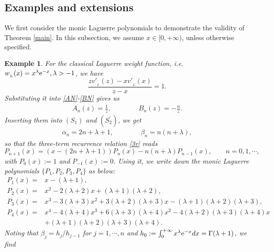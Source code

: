 \documentclass[12pt,a4paper]{article}    %
\newcommand{\e}{{\rm e}}
\newtheorem{exm}{Example}
\numberwithin{equation}{section}
\begin{document}
\subsection{Examples and extensions}\label{exL}
We first consider the monic Laguerre polynomials to demonstrate the validity of Theorem \ref{main}.
In this subsection, we assume $x\in[0,+\infty)$, unless otherwise specified.
		
\begin{exm}
For the classical Laguerre weight function, i.e. $w_{_L}(x)=x^{\lambda}\e^{-x}, \lambda>-1$, we have
\begin{equation*}
\frac{zv'_{_L}(z)-xv'_{_L}(x)}{z-x}=1.
\end{equation*}
Substituting it into \eqref{AN}-\eqref{BN} gives us
\begin{align*}
A_n(z)=\frac{1}{z},\qquad\qquad	
B_n(z)=-\frac{n}{z}.
\end{align*}
Inserting them into $(S_1)$ and $(S^{'}_2)$, we get
\begin{align*}
\alpha_n=2n+\lambda+1,\qquad\qquad
\beta_n=n(n+\lambda),
\end{align*}
so that the three-term recurrence relation \eqref{3r} reads
\begin{equation}\label{r3-1}
P_{n+1}(x)=\left(x-(2n+\lambda+1)\right)P_n(x)-n(n+\lambda)P_{n-1}(x),\qquad n=0,1,\cdots,
\end{equation}
with $P_0(x):=1$ and $P_{-1}(x):=0$. Using it, we write down the monic Laguerre polynomials $\{P_1,P_2,P_3,P_4\}$ as below:
\begin{align*}
P_1(x)=&x-(\lambda+1),\nonumber\\
				 P_2(x)=&x^2-2(\lambda+2)x+(\lambda+1)(\lambda+2),\nonumber\\
				 P_3(x)=&x^3-3(\lambda+3)x^2+3(\lambda+2)(\lambda+3)x-(\lambda+1)(\lambda+2)(\lambda +3),\nonumber\\
				 P_4(x)=&x^4-4(\lambda+4)x^3+6(\lambda+3)(\lambda+4)x^2-4(\lambda+2)(\lambda+3)(\lambda+4)x\\
&+(\lambda+1)(\lambda+2)(\lambda +3)(\lambda+4).			 %
\end{align*}
Noting that $\beta_j=h_j/h_{j-1}$ for $j=1,\cdots,n$ and $h_0:=\int_{0}^{+\infty}x^\lambda \e^{-x}dx=\Gamma(\lambda+1)$, we find
\begin{equation}\label{hn-1}

\end{equation}
\end{exm}
\end{document}
